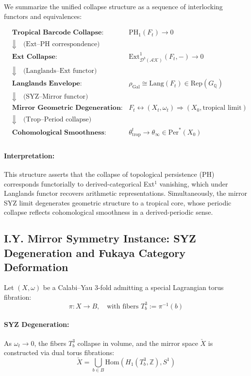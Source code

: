 \documentclass[11pt]{article}
\begin{document}
We summarize the unified collapse structure as a sequence of interlocking functors and equivalences:

\[
\begin{aligned}
&\textbf{Tropical Barcode Collapse:} \quad & \mathrm{PH}_1(F_t) \longrightarrow 0 \\
&\Downarrow \quad \text{(Ext–PH correspondence)} \\
&\textbf{Ext Collapse:} \quad & \mathrm{Ext}^1_{\mathcal{D}^b(\mathcal{AK})}(F_t, -) \longrightarrow 0 \\
&\Downarrow \quad \text{(Langlands–Ext functor)} \\
&\textbf{Langlands Envelope:} \quad & \rho_{\mathrm{Gal}} \cong \text{Lang}(F_t) \in \mathrm{Rep}(G_{\mathbb{Q}}) \\
&\Downarrow \quad \text{(SYZ–Mirror functor)} \\
&\textbf{Mirror Geometric Degeneration:} \quad & F_t \leftrightarrow (X_t, \omega_t) \Rightarrow (X_0, \text{tropical limit}) \\
&\Downarrow \quad \text{(Trop–Period collapse)} \\
&\textbf{Cohomological Smoothness:} \quad & \theta_{\mathrm{trop}}^t \longrightarrow \theta_{\infty} \in \mathrm{Per}^*(X_0) \\
\end{aligned}
\]

\paragraph{Interpretation:}
This structure asserts that the collapse of topological persistence (PH) corresponds functorially to derived-categorical Ext$^1$ vanishing, which under Langlands functor recovers arithmetic representations.  
Simultaneously, the mirror SYZ limit degenerates geometric structure to a tropical core, whose periodic collapse reflects cohomological smoothness in a derived-periodic sense.

\subsection*{I.Y. Mirror Symmetry Instance: SYZ Degeneration and Fukaya Category Deformation}

Let $(X, \omega)$ be a Calabi–Yau 3-fold admitting a special Lagrangian torus fibration:
\[
\pi : X \rightarrow B, \quad \text{with fibers } T^3_b := \pi^{-1}(b)
\]

\paragraph{SYZ Degeneration:}
As $\omega_t \rightarrow 0$, the fibers $T^3_b$ collapse in volume, and the mirror space $\check{X}$ is constructed via dual torus fibrations:
\[
\check{X} = \bigcup_{b \in B} \mathrm{Hom}(H_1(T^3_b, \mathbb{Z}), S^1)
\]
\end{document}
